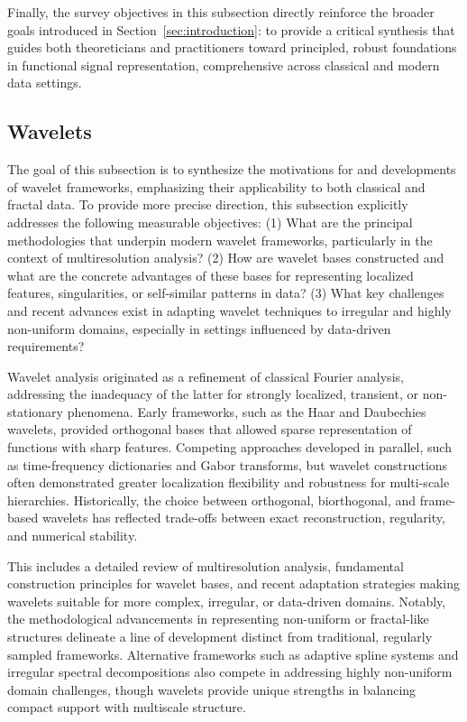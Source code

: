 \documentclass[sigconf]{acmart}
\begin{document}
Finally, the survey objectives in this subsection directly reinforce the broader goals introduced in Section~\ref{sec:introduction}: to provide a critical synthesis that guides both theoreticians and practitioners toward principled, robust foundations in functional signal representation, comprehensive across classical and modern data settings.

\subsection{Wavelets}

The goal of this subsection is to synthesize the motivations for and developments of wavelet frameworks, emphasizing their applicability to both classical and fractal data. To provide more precise direction, this subsection explicitly addresses the following measurable objectives: (1) What are the principal methodologies that underpin modern wavelet frameworks, particularly in the context of multiresolution analysis? (2) How are wavelet bases constructed and what are the concrete advantages of these bases for representing localized features, singularities, or self-similar patterns in data? (3) What key challenges and recent advances exist in adapting wavelet techniques to irregular and highly non-uniform domains, especially in settings influenced by data-driven requirements?

Wavelet analysis originated as a refinement of classical Fourier analysis, addressing the inadequacy of the latter for strongly localized, transient, or non-stationary phenomena. Early frameworks, such as the Haar and Daubechies wavelets, provided orthogonal bases that allowed sparse representation of functions with sharp features. Competing approaches developed in parallel, such as time-frequency dictionaries and Gabor transforms, but wavelet constructions often demonstrated greater localization flexibility and robustness for multi-scale hierarchies. Historically, the choice between orthogonal, biorthogonal, and frame-based wavelets has reflected trade-offs between exact reconstruction, regularity, and numerical stability.

This includes a detailed review of multiresolution analysis, fundamental construction principles for wavelet bases, and recent adaptation strategies making wavelets suitable for more complex, irregular, or data-driven domains. Notably, the methodological advancements in representing non-uniform or fractal-like structures delineate a line of development distinct from traditional, regularly sampled frameworks. Alternative frameworks such as adaptive spline systems and irregular spectral decompositions also compete in addressing highly non-uniform domain challenges, though wavelets provide unique strengths in balancing compact support with multiscale structure.
\end{document}
